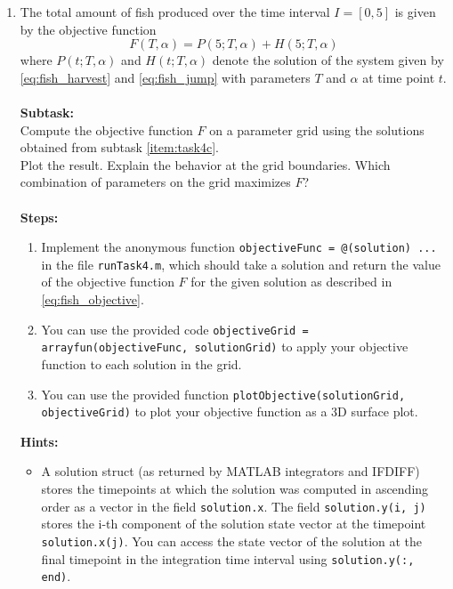 \begin{enumerate}[label=\alph*)]
    \item The total amount of fish produced over the time interval $I = [0, 5]$ is given by the objective function
    \begin{equation}\label{eq:fish_objective}
       F(T, \alpha) = P(5; T, \alpha) + H(5; T, \alpha)
    \end{equation}
    where $P(t; T, \alpha)$ and $H(t; T, \alpha)$ denote the solution of the system given by \cref{eq:fish_harvest} and \cref{eq:fish_jump} with parameters $T$ and $\alpha$ at time point $t$. \\ \\
    \textbf{Subtask:} \\
    Compute the objective function $F$ on a parameter grid using the solutions obtained from subtask \ref{item:task4c}.\\
    Plot the result. Explain the behavior at the grid boundaries. Which combination of parameters on the grid maximizes $F$? \\ \\
    \textbf{Steps:}
    \begin{enumerate}[label=\arabic*.]
       \item Implement the anonymous function \lstinline|objectiveFunc = @(solution) ...| in the file \texttt{runTask4.m}, which should take a solution and return the value of the objective function $F$ for the given solution as described in \cref{eq:fish_objective}.
       \item You can use the provided code \lstinline|objectiveGrid = arrayfun(objectiveFunc, solutionGrid)| to apply your objective function to each solution in the grid.
       \item You can use the provided function \lstinline|plotObjective(solutionGrid, objectiveGrid)| to plot your objective function as a 3D surface plot.
    \end{enumerate}
    \textbf{Hints:}
    \begin{itemize}
       \item A solution struct (as returned by MATLAB integrators and IFDIFF) stores the timepoints at which the solution was computed in ascending order as a vector in the field \lstinline|solution.x|. The field \lstinline|solution.y(i, j)| stores the i-th component of the solution state vector at the timepoint \lstinline|solution.x(j)|. You can access the state vector of the solution at the final timepoint in the integration time interval using \lstinline|solution.y(:, end)|.
    \end{itemize}


\end{enumerate}
